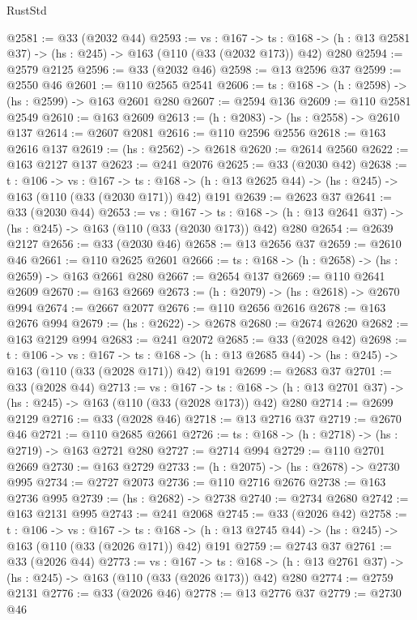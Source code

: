 \begin{lexlean}{RustStd}
\begin{coremodule}
{\begin{coremodule}
{{{{{@2581 := @33 (@2032 @44)
@2593 := {vs : @167} ->
  {ts : @168} -> (h : @13 @2581 @37) -> (hs : @245) -> @163 (@110 (@33 (@2032 @173)) @42) @280
@2594 := @2579 @2125
@2596 := @33 (@2032 @46)
@2598 := @13 @2596 @37
@2599 := @2550 @46
@2601 := @110 @2565 @2541
@2606 := {ts : @168} -> (h : @2598) -> (hs : @2599) -> @163 @2601 @280
@2607 := @2594 @136
@2609 := @110 @2581 @2549
@2610 := @163 @2609
@2613 := (h : @2083) -> (hs : @2558) -> @2610 @137
@2614 := @2607 @2081
@2616 := @110 @2596 @2556
@2618 := @163 @2616 @137
@2619 := (hs : @2562) -> @2618
@2620 := @2614 @2560
@2622 := @163 @2127 @137
@2623 := @241 @2076
@2625 := @33 (@2030 @42)
@2638 := {t : @106} ->
  {vs : @167} ->
  {ts : @168} -> (h : @13 @2625 @44) -> (hs : @245) -> @163 (@110 (@33 (@2030 @171)) @42) @191
@2639 := @2623 @37
@2641 := @33 (@2030 @44)
@2653 := {vs : @167} ->
  {ts : @168} -> (h : @13 @2641 @37) -> (hs : @245) -> @163 (@110 (@33 (@2030 @173)) @42) @280
@2654 := @2639 @2127
@2656 := @33 (@2030 @46)
@2658 := @13 @2656 @37
@2659 := @2610 @46
@2661 := @110 @2625 @2601
@2666 := {ts : @168} -> (h : @2658) -> (hs : @2659) -> @163 @2661 @280
@2667 := @2654 @137
@2669 := @110 @2641 @2609
@2670 := @163 @2669
@2673 := (h : @2079) -> (hs : @2618) -> @2670 @994
@2674 := @2667 @2077
@2676 := @110 @2656 @2616
@2678 := @163 @2676 @994
@2679 := (hs : @2622) -> @2678
@2680 := @2674 @2620
@2682 := @163 @2129 @994
@2683 := @241 @2072
@2685 := @33 (@2028 @42)
@2698 := {t : @106} ->
  {vs : @167} ->
  {ts : @168} -> (h : @13 @2685 @44) -> (hs : @245) -> @163 (@110 (@33 (@2028 @171)) @42) @191
@2699 := @2683 @37
@2701 := @33 (@2028 @44)
@2713 := {vs : @167} ->
  {ts : @168} -> (h : @13 @2701 @37) -> (hs : @245) -> @163 (@110 (@33 (@2028 @173)) @42) @280
@2714 := @2699 @2129
@2716 := @33 (@2028 @46)
@2718 := @13 @2716 @37
@2719 := @2670 @46
@2721 := @110 @2685 @2661
@2726 := {ts : @168} -> (h : @2718) -> (hs : @2719) -> @163 @2721 @280
@2727 := @2714 @994
@2729 := @110 @2701 @2669
@2730 := @163 @2729
@2733 := (h : @2075) -> (hs : @2678) -> @2730 @995
@2734 := @2727 @2073
@2736 := @110 @2716 @2676
@2738 := @163 @2736 @995
@2739 := (hs : @2682) -> @2738
@2740 := @2734 @2680
@2742 := @163 @2131 @995
@2743 := @241 @2068
@2745 := @33 (@2026 @42)
@2758 := {t : @106} ->
  {vs : @167} ->
  {ts : @168} -> (h : @13 @2745 @44) -> (hs : @245) -> @163 (@110 (@33 (@2026 @171)) @42) @191
@2759 := @2743 @37
@2761 := @33 (@2026 @44)
@2773 := {vs : @167} ->
  {ts : @168} -> (h : @13 @2761 @37) -> (hs : @245) -> @163 (@110 (@33 (@2026 @173)) @42) @280
@2774 := @2759 @2131
@2776 := @33 (@2026 @46)
@2778 := @13 @2776 @37
@2779 := @2730 @46
}}}}}
\end{coremodule}}
\end{coremodule}
\end{lexlean}
